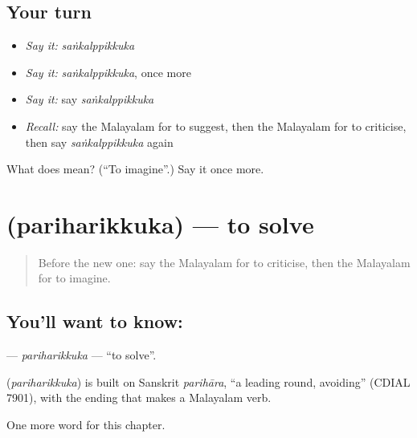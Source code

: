 \subsection*{Your turn}
\begin{itemize}
\raggedright
  \item \emph{Say it:} \emph{saṅkalppikkuka}
  \item \emph{Say it:} \emph{saṅkalppikkuka}, once more
  \item \emph{Say it:} say \emph{saṅkalppikkuka}
  \item \emph{Recall:} say the Malayalam for to suggest, then the Malayalam for to criticise, then say \emph{saṅkalppikkuka} again
\end{itemize}

\begin{tcolorbox}[breakable,colback=teal!4,colframe=teal!35!black,title={Before you move on}]
What does  mean? (\textquotedblleft{}To imagine\textquotedblright{}.) Say it once more.
\end{tcolorbox}
\section[\texorpdfstring{\ml{പരിഹരിക്കുക} (pariharikkuka)}{പരിഹരിക്കുക (pariharikkuka)}]{ (pariharikkuka) — to solve}

\label{lesson:ML-C230-pariharikkuka}



\begin{quote}
Before the new one: say the Malayalam for to criticise, then the Malayalam for to imagine.
\end{quote}

\subsection*{You'll want to know: }
\textbf{} — \emph{pariharikkuka} — \textquotedblleft{}to solve\textquotedblright{}.

\begin{cousinweb}
\textbf{} (\emph{pariharikkuka}) is built on Sanskrit \emph{parihāra}, \textquotedblleft{}a leading round, avoiding\textquotedblright{} (CDIAL 7901), with the ending that makes a Malayalam verb.
\end{cousinweb}

\begin{grammarlens}[title={What you've built}]
One more word for this chapter.
\end{grammarlens}

